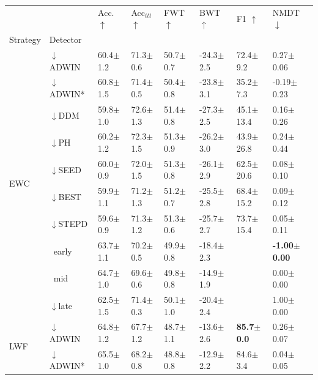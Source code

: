 \begin{tabular}{llllllll}
\toprule
 &  & Acc. $\uparrow$ & Acc$_{ttt}$ $\uparrow$ & FWT $\uparrow$ & BWT $\uparrow$ & F1 $\uparrow$ & NMDT $\downarrow$ \\
Strategy & Detector &  &  &  &  &  &  \\
\midrule
\multirow[t]{10}{*}{EWC} & $\downarrow$ADWIN & 60.4\tiny{$\pm$1.2} & 71.3\tiny{$\pm$0.6} & 50.7\tiny{$\pm$0.7} & -24.3\tiny{$\pm$2.5} & 72.4\tiny{$\pm$9.2} & 0.27\tiny{$\pm$0.06} \\
 & $\downarrow$ADWIN* & 60.8\tiny{$\pm$1.5} & 71.4\tiny{$\pm$0.5} & 50.4\tiny{$\pm$0.8} & -23.8\tiny{$\pm$3.1} & 35.2\tiny{$\pm$7.3} & -0.19\tiny{$\pm$0.23} \\
 & $\downarrow$DDM & 59.8\tiny{$\pm$1.0} & 72.6\tiny{$\pm$1.3} & 51.4\tiny{$\pm$0.8} & -27.3\tiny{$\pm$2.5} & 45.1\tiny{$\pm$13.4} & 0.16\tiny{$\pm$0.26} \\
 & $\downarrow$PH & 60.2\tiny{$\pm$1.2} & 72.3\tiny{$\pm$1.5} & 51.3\tiny{$\pm$0.9} & -26.2\tiny{$\pm$3.0} & 43.9\tiny{$\pm$26.8} & 0.24\tiny{$\pm$0.44} \\
 & $\downarrow$SEED & 60.0\tiny{$\pm$0.9} & 72.0\tiny{$\pm$1.5} & 51.3\tiny{$\pm$0.8} & -26.1\tiny{$\pm$2.9} & 62.5\tiny{$\pm$20.6} & 0.08\tiny{$\pm$0.10} \\
 & $\downarrow$BEST & 59.9\tiny{$\pm$1.1} & 71.2\tiny{$\pm$1.3} & 51.2\tiny{$\pm$0.7} & -25.5\tiny{$\pm$2.8} & 68.4\tiny{$\pm$15.2} & 0.09\tiny{$\pm$0.12} \\
 & $\downarrow$STEPD & 59.6\tiny{$\pm$0.9} & 71.3\tiny{$\pm$1.2} & 51.3\tiny{$\pm$0.6} & -25.7\tiny{$\pm$2.7} & 73.7\tiny{$\pm$15.4} & 0.05\tiny{$\pm$0.11} \\
 & $\ \;$early & 63.7\tiny{$\pm$1.1} & 70.2\tiny{$\pm$0.5} & 49.9\tiny{$\pm$0.8} & -18.4\tiny{$\pm$2.3} &  & \textbf{-1.00\tiny{$\pm$0.00}} \\
 & $\ \;$mid & 64.7\tiny{$\pm$1.0} & 69.6\tiny{$\pm$0.6} & 49.8\tiny{$\pm$0.8} & -14.9\tiny{$\pm$1.9} &  & 0.00\tiny{$\pm$0.00} \\
 & $\downarrow$late & 62.5\tiny{$\pm$1.5} & 71.4\tiny{$\pm$0.3} & 50.1\tiny{$\pm$1.0} & -20.4\tiny{$\pm$2.4} &  & 1.00\tiny{$\pm$0.00} \\
\midrule
\multirow[t]{10}{*}{LWF} & $\downarrow$ADWIN & 64.8\tiny{$\pm$1.2} & 67.7\tiny{$\pm$1.2} & 48.7\tiny{$\pm$1.1} & -13.6\tiny{$\pm$2.6} & \textbf{85.7\tiny{$\pm$0.0}} & 0.26\tiny{$\pm$0.07} \\
 & $\downarrow$ADWIN* & 65.5\tiny{$\pm$1.0} & 68.2\tiny{$\pm$0.8} & 48.8\tiny{$\pm$0.8} & -12.9\tiny{$\pm$2.2} & 84.6\tiny{$\pm$3.4} & 0.04\tiny{$\pm$0.05} \\

\end{tabular}
